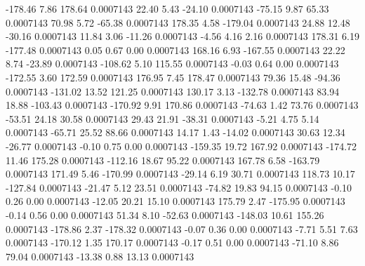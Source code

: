      -178.46        7.86      178.64     0.0007143
       22.40        5.43      -24.10     0.0007143
      -75.15        9.87       65.33     0.0007143
       70.98        5.72      -65.38     0.0007143
      178.35        4.58     -179.04     0.0007143
       24.88       12.48      -30.16     0.0007143
       11.84        3.06      -11.26     0.0007143
       -4.56        4.16        2.16     0.0007143
      178.31        6.19     -177.48     0.0007143
        0.05        0.67        0.00     0.0007143
      168.16        6.93     -167.55     0.0007143
       22.22        8.74      -23.89     0.0007143
     -108.62        5.10      115.55     0.0007143
       -0.03        0.64        0.00     0.0007143
     -172.55        3.60      172.59     0.0007143
      176.95        7.45      178.47     0.0007143
       79.36       15.48      -94.36     0.0007143
     -131.02       13.52      121.25     0.0007143
      130.17        3.13     -132.78     0.0007143
       83.94       18.88     -103.43     0.0007143
     -170.92        9.91      170.86     0.0007143
      -74.63        1.42       73.76     0.0007143
      -53.51       24.18       30.58     0.0007143
       29.43       21.91      -38.31     0.0007143
       -5.21        4.75        5.14     0.0007143
      -65.71       25.52       88.66     0.0007143
       14.17        1.43      -14.02     0.0007143
       30.63       12.34      -26.77     0.0007143
       -0.10        0.75        0.00     0.0007143
     -159.35       19.72      167.92     0.0007143
     -174.72       11.46      175.28     0.0007143
     -112.16       18.67       95.22     0.0007143
      167.78        6.58     -163.79     0.0007143
      171.49        5.46     -170.99     0.0007143
      -29.14        6.19       30.71     0.0007143
      118.73       10.17     -127.84     0.0007143
      -21.47        5.12       23.51     0.0007143
      -74.82       19.83       94.15     0.0007143
       -0.10        0.26        0.00     0.0007143
      -12.05       20.21       15.10     0.0007143
      175.79        2.47     -175.95     0.0007143
       -0.14        0.56        0.00     0.0007143
       51.34        8.10      -52.63     0.0007143
     -148.03       10.61      155.26     0.0007143
     -178.86        2.37     -178.32     0.0007143
       -0.07        0.36        0.00     0.0007143
       -7.71        5.51        7.63     0.0007143
     -170.12        1.35      170.17     0.0007143
       -0.17        0.51        0.00     0.0007143
      -71.10        8.86       79.04     0.0007143
      -13.38        0.88       13.13     0.0007143
